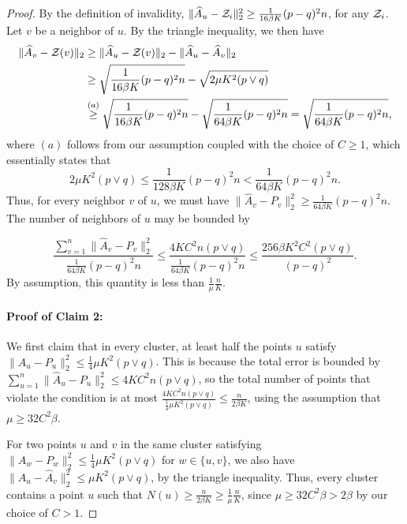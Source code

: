 \documentclass{article}
\begin{document}
\begin{proof}
By the definition of invalidity, $ \| \hat{A}_u - {\cal Z}_i \|_2^2 \geq \frac{1}{16 \beta K} (p-q)^2 n$, for any ${\cal Z}_i$. Let $v$ be a neighbor of $u$. By the triangle inequality, we then have
\begin{align*}
\| \hat A_v - {\cal Z}(v) \|_2 &\geq  \|\hat A_u - {\cal Z}(v) \|_2 -  \|\hat A_u - \hat A_v \|_2 \\
&\geq \sqrt{\frac{1}{16 \beta K} (p-q)^2 n} - \sqrt{2 \mu K^2 (p \vee q)}\\
&\stackrel{(a)}\geq  \sqrt{\frac{1}{16 \beta K} (p-q)^2 n} - \sqrt{\frac{1}{64 \beta K} (p-q)^2 n} = \sqrt{\frac{1}{64 \beta K} (p-q)^2 n},
\end{align*}
where $(a)$ follows from our assumption coupled with the choice of $C \geq 1$, which essentially states that
$$2 \mu K^2 (p \vee q) \leq \frac{1}{128 \beta K} (p-q)^2 n < \frac{1}{64 \beta K} (p-q)^2 n.$$
Thus, for every neighbor $v$ of $u$, we must have $\| \hat{A}_v - P_v \|_2^2 \geq \frac{1}{64 \beta K} (p-q)^2 n$. The number of neighbors of $u$ may be bounded by 

\[
\frac{\sum_{v=1}^n \| \hat{A}_v - P_v \|_2^2}{ \frac{1}{64 \beta K} (p-q)^2 n } \leq 
        \frac{ 4 K C^2 n (p \vee q)}{ \frac{1}{64 \beta K} (p-q)^2 n} \leq \frac{256 \beta K^2 C^2 (p \vee q)}{(p-q)^2}. 
\]
By assumption, this quantity is less than $\frac{1}{\mu} \frac{n}{K}$.

\paragraph{\textbf{Proof of Claim 2:}} We first claim that in every cluster, at least half the points $u$ satisfy $\| \hat{A}_u - P_u \|_2^2 \leq \frac{1}{4} \mu K^2 (p \vee q)$. This is because the total error is bounded by $\sum_{u=1}^n \| \hat{A}_u - P_u \|_2^2 \leq 4 K C^2 n (p \vee q)$, so the total number of points that violate the condition is at most $\frac{ 4 K C^2 n (p \vee q)}{ \frac{1}{4} \mu K^2 (p \vee q)} \leq \frac{n}{2 \beta K}$, using the assumption that $\mu \geq 32 C^2 \beta$. 

For two points $u$ and $v$ in the same cluster satisfying $\| \hat{A}_w - P_w \|_2^2 \leq  \frac{1}{4} \mu K^2 (p \vee q)$ for $w \in \{u,v\}$, we also have $\| \hat{A}_u - \hat{A}_v \|_2^2 \leq \mu K^2 (p \vee q)$, by the triangle inequality. Thus, every cluster contains a point $u$ such that $N(u) \geq \frac{n}{2\beta K} \geq \frac{1}{\mu} \frac{n}{K}$, since $\mu \geq 32C^2\beta > 2\beta$ by our choice of $C > 1$.


\end{proof}
\end{document}
